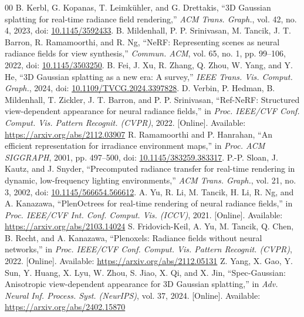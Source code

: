 \begin{thebibliography}{00}
 B. Kerbl, G. Kopanas, T. Leimkühler, and G. Drettakis, ``3D Gaussian splatting for real-time radiance field rendering,'' \textit{ACM Trans. Graph.}, vol. 42, no. 4, 2023, doi: \href{https://doi.org/10.1145/3592433}{10.1145/3592433}.
 B. Mildenhall, P. P. Srinivasan, M. Tancik, J. T. Barron, R. Ramamoorthi, and R. Ng, ``NeRF: Representing scenes as neural radiance fields for view synthesis,'' \textit{Commun. ACM}, vol. 65, no. 1, pp. 99--106, 2022, doi: \href{https://doi.org/10.1145/3503250}{10.1145/3503250}.
 B. Fei, J. Xu, R. Zhang, Q. Zhou, W. Yang, and Y. He, ``3D Gaussian splatting as a new era: A survey,'' \textit{IEEE Trans. Vis. Comput. Graph.}, 2024, doi: \href{https://doi.org/10.1109/TVCG.2024.3397828}{10.1109/TVCG.2024.3397828}.
 D. Verbin, P. Hedman, B. Mildenhall, T. Zickler, J. T. Barron, and P. P. Srinivasan, ``Ref-NeRF: Structured view-dependent appearance for neural radiance fields,'' in \textit{Proc. IEEE/CVF Conf. Comput. Vis. Pattern Recognit. (CVPR)}, 2022. [Online]. Available: \url{https://arxiv.org/abs/2112.03907}
 R. Ramamoorthi and P. Hanrahan, ``An efficient representation for irradiance environment maps,'' in \textit{Proc. ACM SIGGRAPH}, 2001, pp. 497--500, doi: \href{https://doi.org/10.1145/383259.383317}{10.1145/383259.383317}.
 P.-P. Sloan, J. Kautz, and J. Snyder, ``Precomputed radiance transfer for real-time rendering in dynamic, low-frequency lighting environments,'' \textit{ACM Trans. Graph.}, vol. 21, no. 3, 2002, doi: \href{https://doi.org/10.1145/566654.566612}{10.1145/566654.566612}.
 A. Yu, R. Li, M. Tancik, H. Li, R. Ng, and A. Kanazawa, ``PlenOctrees for real-time rendering of neural radiance fields,'' in \textit{Proc. IEEE/CVF Int. Conf. Comput. Vis. (ICCV)}, 2021. [Online]. Available: \url{https://arxiv.org/abs/2103.14024}
 S. Fridovich-Keil, A. Yu, M. Tancik, Q. Chen, B. Recht, and A. Kanazawa, ``Plenoxels: Radiance fields without neural networks,'' in \textit{Proc. IEEE/CVF Conf. Comput. Vis. Pattern Recognit. (CVPR)}, 2022. [Online]. Available: \url{https://arxiv.org/abs/2112.05131}
 Z. Yang, X. Gao, Y. Sun, Y. Huang, X. Lyu, W. Zhou, S. Jiao, X. Qi, and X. Jin, ``Spec-Gaussian: Anisotropic view-dependent appearance for 3D Gaussian splatting,'' in \textit{Adv. Neural Inf. Process. Syst. (NeurIPS)}, vol. 37, 2024. [Online]. Available: \url{https://arxiv.org/abs/2402.15870}

\end{thebibliography}
